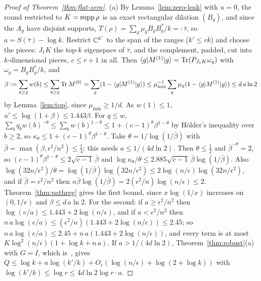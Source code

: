 \begin{proof}[Proof of Theorem~\ref{thm:flat-zero}]
(a) By Lemma~\ref{lem:zero-leak} with $u=0$, the round restricted to $K=\operatorname{supp}\rho$ is an exact rectangular dilation $(B_g)$, and since the $A_g$ have disjoint supports,
$T(\rho)=\sum_g\mu_gB_gB_g^*/k=:\bar\tau$, so $a=S(\bar\tau)-\log k$. Restrict $\mathbb C^{k'}$ to the span of the ranges ($k'\le rk$) and choose the pieces: $J_1K$ the
top-$k$ eigenspace of $\bar\tau$, and the complement, padded, cut into $k$-dimensional pieces, $c\le r+1$ in all. Then
$\langle g\rvert M^{(1)}\lvert g\rangle=\operatorname{Tr}(P_{J_1K}\omega_g)$ with $\omega_g=B_gB_g^*/k$, and
\[
\beta:=\sum_{b\ge2}w(b)\le\sum_{b\ge2}\operatorname{Tr} M^{(b)}=\sum_g(1-\langle g\rvert M^{(1)}\lvert g\rangle)\le\mu_{\min}^{-1}\sum_g\mu_g(1-\langle g\rvert M^{(1)}\lvert g\rangle)\le d\,a\ln2
\]
by Lemma~\ref{lem:top}, since $\mu_{\min}\ge1/d$. As $w(1)\le1$, $u'\le\log(1+\beta)\le1.443\beta$. For $q\le w$, $\sum_bq_bw(b)^{-\theta}\le\sum_bw(b)^{1-\theta}\le1+(c-1)^\theta\beta^{1-\theta}$
by H\"older's inequality over $b\ge2$, so $\kappa_\theta\le1+(c-1)^\theta\beta^{1-\theta}$. Take $\theta=1/\log(1/\bar\beta)$ with $\bar\beta=\max(\beta,\epsilon^2/n^2)\le\frac14$;
this needs $a\le1/(4d\ln2)$. Then $\theta\le\frac12$ and $\bar\beta^{-\theta}=2$, so $(c-1)^\theta\beta^{1-\theta}\le2\sqrt{c-1}\,\bar\beta$ and
$\log\kappa_\theta/\theta\le2.885\sqrt{c-1}\,\bar\beta\log(1/\bar\beta)$. Also $\log(32n/\epsilon^2)/\theta=\log(1/\bar\beta)\log(32n/\epsilon^2)\le2\log(n/\epsilon)\log(32n/\epsilon^2)$,
and if $\bar\beta=\epsilon^2/n^2$ then $n\bar\beta\log(1/\bar\beta)=2(\epsilon^2/n)\log(n/\epsilon)\le2$. Theorem~\ref{thm:pathreg} gives the first bound, since $x\log(1/x)$
increases on $(0,1/e)$ and $\beta\le d\,a\ln2$. For the second: if $a\ge\epsilon^2/n^2$ then $\log(e/a)\le1.443+2\log(n/\epsilon)$, and if $a<\epsilon^2/n^2$ then
$n\,a\log(e/a)\le(\epsilon^2/n)(1.443+2\log(n/\epsilon))\le2.45$; so $n\,a\log(e/a)\le2.45+n\,a(1.443+2\log(n/\epsilon))$, and every term is at most
$K\log^2(n/\epsilon)(1+\log k+n\,a)$. If $a>1/(4d\ln2)$, Theorem~\ref{thm:robust}(a) with $G=I$, which is~\cite[Theorem~12.2]{DouglasMghirbiC}, gives $Q\le\log k+n\log(k'/k)+O_r(\log(n/\epsilon)+\log(2+\log k))$ with
$\log(k'/k)\le\log r\le4d\ln2\log r\cdot a$.


\end{proof}
